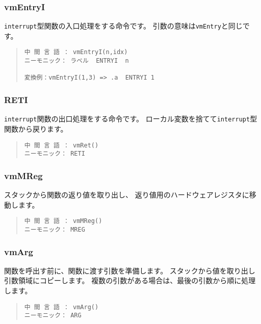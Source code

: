 \subsubsection{vmEntryI}

\verb/interrupt/型関数の入口処理をする命令です。
引数の意味は\verb/vmEntry/と同じです。

\begin{quote}
\begin{verbatim}
中 間 言 語 ： vmEntryI(n,idx)
ニーモニック： ラベル  ENTRYI  n

変換例：vmEntryI(1,3) => .a  ENTRYI 1
\end{verbatim}
\end{quote}

\subsubsection{RETI}

\verb/interrupt/関数の出口処理をする命令です。
ローカル変数を捨てて\verb/interrupt/型関数から戻ります。

\begin{quote}
\begin{verbatim}
中 間 言 語 ： vmRet()
ニーモニック： RETI
\end{verbatim}
\end{quote}

\subsubsection{vmMReg}

スタックから関数の返り値を取り出し、
返り値用のハードウェアレジスタに移動します。

\begin{quote}
\begin{verbatim}
中 間 言 語 ： vmMReg()
ニーモニック： MREG
\end{verbatim}
\end{quote}

\subsubsection{vmArg}

関数を呼出す前に、関数に渡す引数を準備します。
スタックから値を取り出し引数領域にコピーします。
複数の引数がある場合は、最後の引数から順に処理します。

\begin{quote}
\begin{verbatim}
中 間 言 語 ： vmArg()
ニーモニック： ARG
\end{verbatim}
\end{quote}

